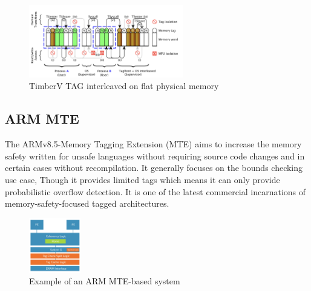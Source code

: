  \begin{figure}[htbp!] 
  \centering
  \includegraphics[width=0.6\textwidth]{Timber-V}
  \caption[MTE]{TimberV TAG interleaved on flat physical memory\cite{weiser_timber-v_2019}}
  \label{fig:MTE}
  \end{figure}

	
\subsection{ARM MTE \cite{ARMMTE}}
The ARMv8.5-Memory Tagging Extension (MTE) aims to increase the memory safety written for 
unsafe languages without requiring source code changes and in certain cases without 
recompilation. It generally focuses on the bounds checking use case, Though it 
provides limited tags which means it can only provide probabilistic overflow detection. 
It is one of the latest commercial incarnations of memory-safety-focused tagged architectures.   

\begin{figure}[htbp!] 
  \centering    
  \includegraphics[width=0.2\textwidth]{ARMMTE}
  \caption[MTE]{Example of an ARM MTE-based system \cite{ARMMTE}}
  \label{fig:MTE}
  \end{figure}

